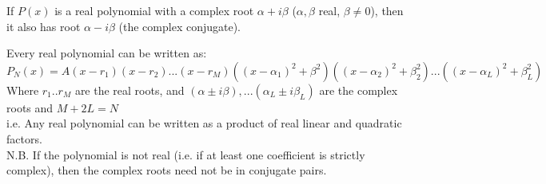 \begin{corollary}
If $P(x)$ is a real polynomial with a complex root $\alpha + i\beta$ ($\alpha, \beta$ real, $\beta \neq 0$), then it also has root $\alpha - i\beta$ (the complex conjugate).
\end{corollary}

\begin{corollary}
Every real polynomial can be written as:\\ $P_N(x) = A(x-r_1)(x-r_2)...(x-r_M)((x-\alpha _1)^2 + \beta ^2)((x-\alpha _2)^2 + \beta _2^2)...((x - \alpha _ L)^2 + \beta _L^2)$\\

Where $r_1.. r_M$ are the real roots, and $(\alpha \pm i \beta),... (\alpha _L \pm i\beta _L)$ are the complex roots and $M + 2L = N$\\

i.e. Any real polynomial can be written as a product of real linear and quadratic factors.\\

N.B. If the polynomial is not real (i.e. if at least one coefficient is strictly complex), then the complex roots need not be in conjugate pairs.\\
\end{corollary}



